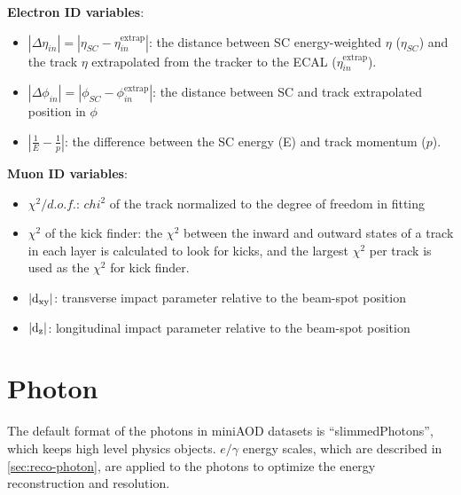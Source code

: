 \documentclass[thesis.tex]{subfiles}
\renewcommand\_{\textunderscore\allowbreak}
\begin{document}
\noindent \textbf{Electron ID variables}:
\begin{itemize}
	\item $|\Delta\eta_{in}| = |\eta_{SC} - \eta_{in}^{\text{extrap}}|$: the distance between SC energy-weighted $\eta$ ($\eta_{SC}$) and the track $\eta$ extrapolated from the tracker to the ECAL ($\eta_{in}^{\text{extrap}}$).
	\item $|\Delta\phi_{in}| = |\phi_{SC} - \phi_{in}^{\text{extrap}}|$: the distance between SC and track extrapolated position in $\phi$
	\item $|\frac{1}{E} - \frac{1}{p}|$: the difference between the SC energy (E) and track momentum ($p$).  
\end{itemize}

\noindent \textbf{Muon ID variables}:
\begin{itemize}
	\item $\chi^2/d.o.f.$: $chi^2$ of the track normalized to the degree of freedom in fitting 
	\item $\chi^2$ of the kick finder: the $\chi^2$ between the inward and outward states of a track in each layer is calculated to look for kicks, and the largest $\chi^2$ per track is used as the $\chi^2$ for kick finder.
	\item $\mathrm{|d_{xy}|}$: transverse impact parameter relative to the beam-spot position
	\item $\mathrm{|d_{z}|}$: longitudinal impact parameter relative to the beam-spot position 
\end{itemize}


\section{Photon}
\label{subsec:photonID}
The default format of the photons in miniAOD datasets is ``slimmedPhotons'', which keeps high level physics objects. 
$e/\gamma$ energy scales, which are described in \ref{sec:reco-photon}, are applied to the photons to optimize the energy reconstruction and resolution. 
\end{document}
